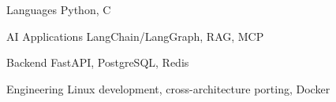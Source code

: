 

\begin{cvskills}

\cvskill
  {Languages}
  {Python, C}

  \cvskill
    {AI Applications}
    {LangChain/LangGraph, RAG, MCP}

  \cvskill
    {Backend}
    {FastAPI, PostgreSQL, Redis}

  \cvskill
    {Engineering}
    {Linux development, cross-architecture porting, Docker}

\end{cvskills}
